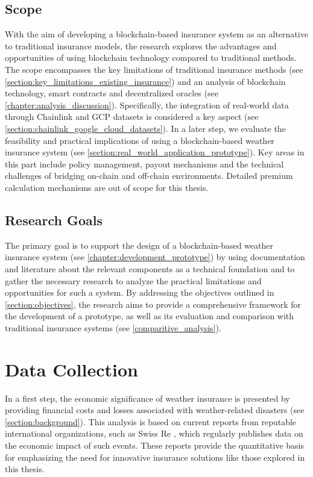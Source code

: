 \subsection{Scope}
With the aim of developing a blockchain-based insurance system as an alternative to traditional insurance models, the research explores the advantages and opportunities of using blockchain technology compared to traditional methods. The scope encompasses the key limitations of traditional insurance methods (see \cref{section:key_limitations_existing_insurance}) and an analysis of blockchain technology, smart contracts and decentralized oracles (see \cref{chapter:analysis_discussion}). Specifically, the integration of real-world data through Chainlink and GCP datasets is considered a key aspect (see \cref{section:chainlink_google_cloud_datasets}). In a later step, we evaluate the feasibility and practical implications of using a blockchain-based weather insurance system (see \cref{section:real_world_application_prototype}). Key areas in this part include policy management, payout mechanisms and the technical challenges of bridging on-chain and off-chain environments. Detailed premium calculation mechanisms are out of scope for this thesis.

\subsection{Research Goals}
The primary goal is to support the design of a blockchain-based weather insurance system (see \cref{chapter:development_prototype}) by using documentation and literature about the relevant components as a technical foundation and to gather the necessary research to analyze the practical limitations and opportunities for such a system. By addressing the objectives outlined in \cref{section:objectives}, the research aims to provide a comprehensive framework for the development of a prototype, as well as its evaluation and comparison with traditional insurance systems (see \cref{comparitive_analysis}).

\section{Data Collection}\label{section:data_collection}
In a first step, the economic significance of weather insurance is presented by providing financial costs and losses associated with weather-related disasters (see \cref{section:background}). This analysis is based on current reports from reputable international organizations, such as Swiss Re \autocite{swissre2017}, which regularly publishes data on the economic impact of such events. These reports provide the quantitative basis for emphasizing the need for innovative insurance solutions like those explored in this thesis.

